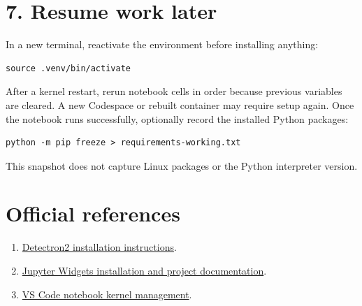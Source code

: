 \documentclass[10pt]{article}
\begin{document}
\section*{7. Resume work later}
In a new terminal, reactivate the environment before installing anything:
\begin{lstlisting}
source .venv/bin/activate
\end{lstlisting}
After a kernel restart, rerun notebook cells in order because previous variables are cleared. A new Codespace or rebuilt container may require setup again. Once the notebook runs successfully, optionally record the installed Python packages:
\begin{lstlisting}
python -m pip freeze > requirements-working.txt
\end{lstlisting}
This snapshot does not capture Linux packages or the Python interpreter version.

\section*{Official references}
\small
\begin{enumerate}
\item \href{https://github.com/facebookresearch/detectron2/blob/main/INSTALL.md}{Detectron2 installation instructions}.
\item \href{https://github.com/jupyter-widgets/ipywidgets}{Jupyter Widgets installation and project documentation}.
\item \href{https://code.visualstudio.com/docs/datascience/jupyter-kernel-management}{VS Code notebook kernel management}.
\end{enumerate}
\end{document}
